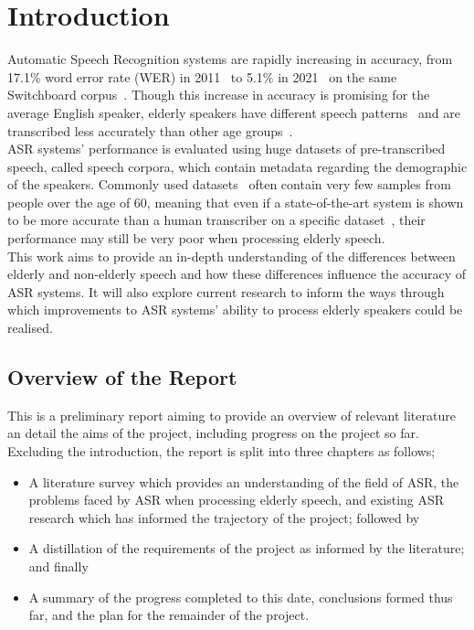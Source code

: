 \chapter{Introduction}\label{ch:introduction}

Automatic Speech Recognition systems are rapidly increasing in accuracy, from 17.1\% word error
rate (WER) in 2011~\cite{seide2011} to 5.1\% in 2021~\cite{Ng2021} on the same Switchboard
corpus~\cite{switchboard}.
Though this increase in accuracy is promising for the average English speaker, elderly speakers
have different speech patterns~\cite{Horton2010} and are transcribed less accurately than other age
groups~\cite{picone1990}.\\

ASR systems' performance is evaluated using huge datasets of pre-transcribed speech, called
speech corpora, which contain metadata regarding the demographic of the speakers.
Commonly used datasets~\cite{librispeech, switchboard} often contain very few samples
from people over the age of 60, meaning that even if a state-of-the-art system is shown to be more
accurate than a human transcriber on a specific dataset~\cite{chung2021}, their performance may
still be very poor when processing elderly speech.\\

This work aims to provide an in-depth understanding of the differences between elderly and
non-elderly speech and how these differences influence the accuracy of ASR systems.
It will also explore current research to inform the ways through which improvements to ASR systems'
ability to process elderly speakers could be realised.

\section{Overview of the Report}\label{sec:overview-of-the-report}

This is a preliminary report aiming to provide an overview of relevant literature an detail the
aims of the project, including progress on the project so far.
Excluding the introduction, the report is split into three chapters as follows;

\begin{itemize}
    \item A literature survey which provides an understanding of the field of ASR, the problems
    faced by ASR when processing elderly speech, and existing ASR research which has informed the
    trajectory of the project;
    followed by
    \item A distillation of the requirements of the project as informed by the literature;
    and finally
    \item A summary of the progress completed to this date, conclusions formed thus far, and the
    plan for the remainder of the project.
\end{itemize}